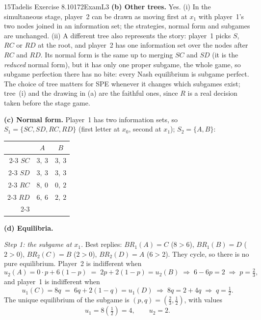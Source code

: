 \begin{exsol}{15}{Tadelis Exercise 8.10}{172}{Exam}{L3}
\textbf{(b) Other trees.} Yes. (i) In the simultaneous stage, player~2 can be drawn as moving
first at $x_1$ with player~1's two nodes joined in an information set; the strategies, normal
form and subgames are unchanged. (ii) A different tree also represents the story: player~1
picks $S$, $RC$ or $RD$ at the root, and player~2 has one information set over the nodes after
$RC$ and $RD$. Its normal form is the same up to merging $SC$ and $SD$ (it is the
\emph{reduced} normal form), but it has only one proper subgame, the whole game, so subgame
perfection there has no bite: every Nash equilibrium is subgame perfect. The choice of tree matters
for SPE whenever it changes which subgames exist; tree~(i) and the drawing in (a) are the
faithful ones, since $R$ is a real decision taken before the stage game.

\textbf{(c) Normal form.} Player~1 has two information sets, so
$S_1 = \{SC, SD, RC, RD\}$ (first letter at $x_0$, second at $x_1$); $S_2 = \{A, B\}$:
\begin{center}
\begin{tabular}{r|c|c|}
\multicolumn{1}{r}{} & \multicolumn{1}{c}{$A$} & \multicolumn{1}{c}{$B$}\\ \cline{2-3}
$SC$ & $3,\ 3$ & $3,\ 3$ \\ \cline{2-3}
$SD$ & $3,\ 3$ & $3,\ 3$ \\ \cline{2-3}
$RC$ & $8,\ 0$ & $0,\ 2$ \\ \cline{2-3}
$RD$ & $6,\ 6$ & $2,\ 2$ \\ \cline{2-3}
\end{tabular}
\end{center}

\textbf{(d) Equilibria.}

\emph{Step 1: the subgame at $x_1$.} Best replies: $BR_1(A) = C$ ($8 > 6$), $BR_1(B) = D$
($2 > 0$), $BR_2(C) = B$ ($2 > 0$), $BR_2(D) = A$ ($6 > 2$). They cycle, so there is no pure
equilibrium. Player~2 is indifferent when
\begin{equation}
  u_2(A) = 0\cdot p + 6(1-p) \;=\; 2p + 2(1-p) = u_2(B)
  \;\Rightarrow\; 6 - 6p = 2 \;\Rightarrow\; p = \tfrac23 , \label{eq:15p}
\end{equation}
and player~1 is indifferent when
\begin{equation}
  u_1(C) = 8q \;=\; 6q + 2(1-q) = u_1(D)
  \;\Rightarrow\; 8q = 2 + 4q \;\Rightarrow\; q = \tfrac12 . \label{eq:15q}
\end{equation}
The unique equilibrium of the subgame is $(p,q) = (\frac23, \frac12)$, with values
\[
  u_1 = 8\left(\tfrac12\right) = 4, \qquad u_2 = 2 .
\]


\end{exsol}
